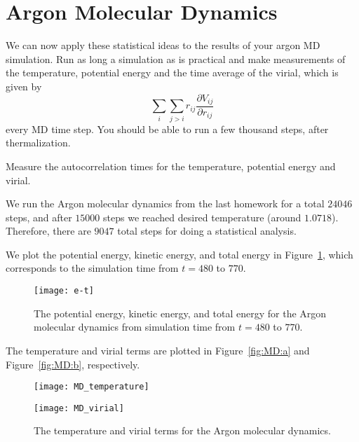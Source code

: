 \section{Argon Molecular Dynamics}

We can now apply these statistical ideas to the results of your argon MD simulation. Run as
long a simulation as is practical and make measurements of the temperature, potential energy
and the time average of the virial, which is given by
%
\begin{equation}
    \sum_i \sum_{j > i} r_{ij} \frac{ \partial V_{ij} }{ \partial r_{ij} }
\end{equation}
%
every MD time step. You should be able to run a few thousand steps, after thermalization.


\Question{} Measure the autocorrelation times for the temperature, potential energy and
virial.

\Answer{}
We run the Argon molecular dynamics from the last homework for a total \(24046\) steps,
and after \(15000\) steps we reached desired temperature (around \(1.0718\)).
Therefore, there are \(9047\) total steps for doing a statistical analysis.

We plot the potential energy, kinetic energy, and total energy in Figure~\ref{fig:MD_e_t},
which corresponds to the simulation time from \(t = 480\) to \(770\).

\begin{figure}[hb]
    \centering
    \texttt{[image: e-t]}
    \caption{The potential energy, kinetic energy, and total energy for the
        Argon molecular dynamics from simulation time from \(t = 480\) to \(770\).}
    \label{fig:MD_e_t}
\end{figure}

The temperature and virial terms are plotted in
Figure~\ref{fig:MD:a} and Figure~\ref{fig:MD:b}, respectively.

\begin{figure}[H]
    \centering
    \begin{minipage}[t]{0.8\linewidth}
        \centering
        \texttt{[image: MD\_temperature]}
        \label{fig:MD:a}
    \end{minipage}
    \hfill
    \begin{minipage}[t]{0.8\linewidth}
        \centering
        \texttt{[image: MD\_virial]}
        \label{fig:MD:b}
    \end{minipage}
    \caption{The temperature and virial terms for the
        Argon molecular dynamics.}
    \label{fig:MD}
\end{figure}

